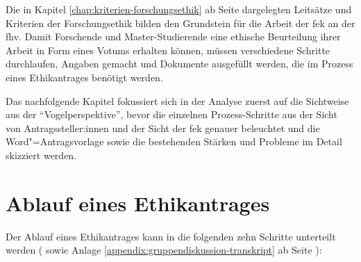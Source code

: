 \documentclass[a4paper,12pt,twoside]{scrreprt}
\begin{document}
Die in Kapitel \ref{chap:kriterien-forschungsethik} ab Seite \pageref{chap:kriterien-forschungsethik} dargelegten Leitsätze und Kriterien der Forschungsethik bilden den Grundstein für die Arbeit der \acl{fek} an der \acl{fhv}. Damit Forschende und Master-Studierende eine ethische Beurteilung ihrer Arbeit in Form eines Votums erhalten können, müssen verschiedene Schritte durchlaufen, Angaben gemacht und Dokumente ausgefüllt werden, die im Prozess eines Ethikantrages benötigt werden.

\medskip

Das nachfolgende Kapitel fokussiert sich in der Analyse zuerst auf die Sichtweise aus der \enquote{Vogelperspektive}, bevor die einzelnen Prozess-Schritte aus der Sicht von Antragssteller:innen und der Sicht der \ac{fek} genauer beleuchtet und die Word"=Antragsvorlage sowie die bestehenden Stärken und Probleme im Detail skizziert werden.

\section{Ablauf eines Ethikantrages}
\label{sec:ablauf-ethikantrag}

Der Ablauf eines Ethikantrages kann in die folgenden zehn Schritte unterteilt werden (\cite{fachhochschule_vorarlberg_gmbh_forschungsethik-kommission_2021, forschungsethik-kommission_der_fachhochschule_vorarlberg_verfahrensordnung_2020} sowie Anlage \ref{appendix:gruppendiskussion-transkript} ab Seite \pageref{appendix:gruppendiskussion-transkript}):
\end{document}
